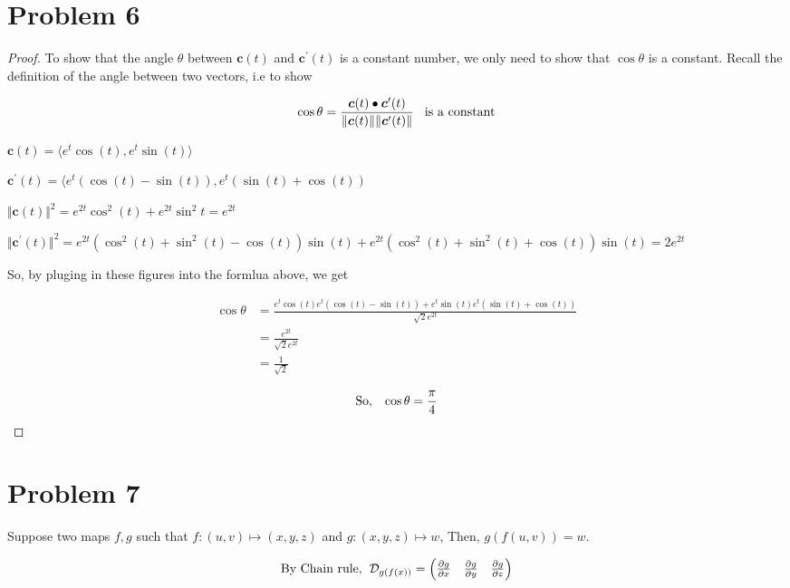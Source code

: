 \documentclass[12pt]{article}
\renewcommand{\vec}[1]{\boldsymbol{#1}}
\begin{document}
\section*{Problem 6}
\begin{proof}
    To show that the angle $\theta$ between $\vec{c}(t)$ and 
    $\vec{c}^{\prime}(t)$ is a constant number, we only need to show that
    $\cos{\theta}$ is a constant. Recall the definition of the angle
    between two vectors, i.e to show

    \[ \cos{\theta} = \frac{\vec c(t) \bullet \vec c^{\prime}(t)}
    {\Vert \vec c(t) \Vert \Vert \vec c^{\prime}(t) \Vert}
    \hspace*{0.3cm} \text{is a constant}\]

    
    $ \vec c(t) = \langle e^t\cos(t),e^t\sin(t) \rangle $
    
    
    $ \vec c^{\prime}(t) = \langle e^t(\cos(t) - \sin(t)) ,
    e^t( \sin(t) + \cos(t))$
    

    $ \Vert \vec c(t) \Vert^2 = e^{2t}\cos^2(t) + e^{2t}\sin^2{t}
    = e^{2t}$
   
    $\Vert \vec c^{\prime}(t) \Vert^2  = e^{2t}(\cos^2(t)+\sin^2(t)
    -\cos(t))\sin(t)+e^{2t}(\cos^2(t)+\sin^2(t)
    +\cos(t))\sin(t) 
     = 2e^{2t} $

    So, by pluging in these figures into the formlua above, we get

    \begin{align*}
    \cos{\theta} &= \frac{e^t\cos(t)e^t(\cos(t)-\sin(t))
    + e^t\sin(t)e^t(\sin(t)+\cos(t))}{\sqrt{2}e^{2t}} \\
    &= \frac{e^{2t}}{\sqrt{2}e^{2t}} \\
    & = \frac{1}{\sqrt{2}}
    \end{align*}

    \[ \text{So,} \hspace*{0.3cm} \cos{\theta} = \frac{\pi}{4} \]

\end{proof}

\newpage
\section*{Problem 7}
Suppose two maps $f,g$ such that $ f:(u,v) \mapsto (x,y,z)$
and $g: (x,y,z) \mapsto w$,
Then, $g(f(u,v))=w$.

\[ \text{By Chain rule,}\hspace*{0.2cm}\mathcal{D}_{g(f(x))} = 
\begin{pmatrix}
    \frac{\partial g}{\partial x} & \frac{\partial g}{\partial y} & \frac{\partial g}{\partial z} 
\end{pmatrix} \]
\end{document}
